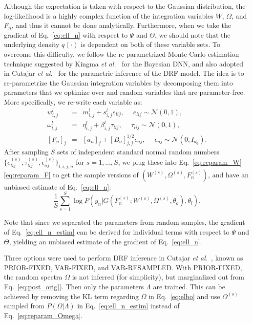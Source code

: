 \documentclass[conference]{IEEEtran}
\begin{document}
Although the expectation is taken with respect to the Gaussian distribution, the log-likelihood is a highly complex function of the integration variables $W$, $\Omega$, and $F_n$, and thus it cannot be done analytically. Furthermore, when we take the gradient of Eq.~\ref{eq:ell_n} with respect to $\Psi$ and 
$\Theta$, we should note that the underlying density $q(\cdot)$ is dependent 
on both of these variable sets. 
To overcome this difficulty, we follow the re-parametrized Monte-Carlo 
estimation technique suggested by Kingma {\em et al.}~\cite{autoenc_vb14} for the Bayesian DNN, and also adopted in Cutajar {\em et al.}~\cite{rfdnn17} for the parametric inference of the DRF model. The idea is to re-parametrize the Gaussian integration variables by decomposing them into parameters that we optimize over and random variables that are 
parameter-free. More specifically, we re-write each variable as:
\begin{eqnarray}
w^l_{i,j} &=&    \label{eq:reparam_W}
    m^l_{i,j} + s^l_{i,j} e_{lij}, \ \ \ \ \ \ 
    e_{lij} \sim \mathcal{N}(0,1), \\ 
\omega^l_{i,j} &=&    \label{eq:reparam_Omega}
    \eta^l_{i,j} + \beta^l_{i,j} \tau_{lij}, \ \ \ \ \ \ 
    \tau_{lij} \sim \mathcal{N}(0,1), \\ 
{[F_n]}_j &=&    \label{eq:reparam_F}
    [a_n]_j + {[B_n]}^{1/2}_{j,j} \epsilon_{nj}, \ \ \ \ \ \ 
    \epsilon_{nj} \sim \mathcal{N}(0,I_{d_0}).
\end{eqnarray}
After sampling $S$ sets of independent standard normal random numbers 
$\{ e^{(s)}_{lij}, \tau^{(s)}_{lij}, \epsilon^{(s)}_{nj} \}_{l,i,j,n}$ for 
$s=1,\dots,S$, we plug these into Eq.~\ref{eq:reparam_W}--\ref{eq:reparam_F} 
to get the sample versions of $(W^{(s)}, \Omega^{(s)}, F^{(s)}_n)$, and 
have an unbiased estimate of Eq.~\ref{eq:ell_n}:
\begin{equation}
\frac{1}{S} \sum_{s=1}^S 
    \log P(y_n|G(F^{(s)}_n; W^{(s)}, \Omega^{(s)}, \theta_o), \theta_l).
\label{eq:ell_n_estim}
\end{equation}


Note that since we separated the parameters from random samples, 
the gradient of Eq.~\ref{eq:ell_n_estim} can be derived for individual 
terms with respect to $\Psi$ and $\Theta$, yielding an unbiased estimate of 
the gradient of Eq.~\ref{eq:ell_n}. 

Three options were used to perform DRF inference in Cutajar {\em et al.}~\cite{rfdnn17}, known as  PRIOR-FIXED, VAR-FIXED, and VAR-RESAMPLED. With PRIOR-FIXED,  the random spectra $\Omega$ is not inferred (for simplicity), but marginalized out 
from Eq.~\ref{eq:post_orig}). Then only the parameters $\Lambda$ are trained. This can be achieved by removing the KL term regarding $\Omega$ in Eq.~\ref{eq:elbo} and use $\Omega^{(s)}$ sampled from $P(\Omega|\Lambda)$ in 
Eq.~\ref{eq:ell_n_estim} instead of Eq.~\ref{eq:reparam_Omega}. 
\end{document}
